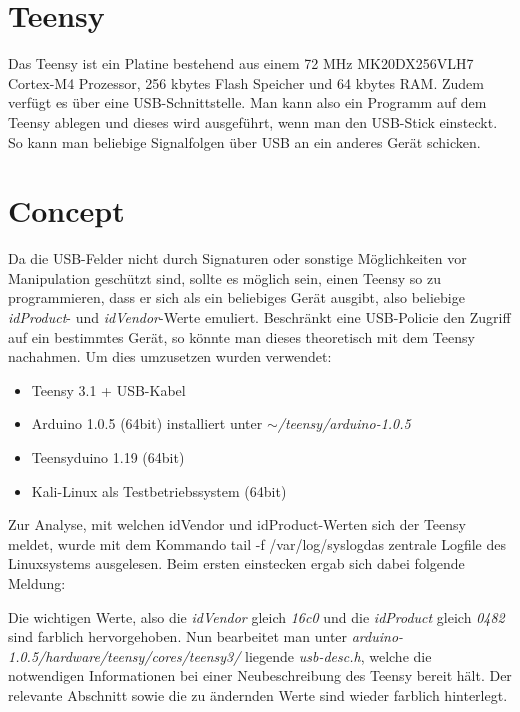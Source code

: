 \section{Teensy}
Das Teensy ist ein Platine bestehend aus einem 72 MHz MK20DX256VLH7 Cortex-M4 Prozessor, 256 kbytes Flash Speicher und 64 kbytes RAM. Zudem verfügt es über eine USB-Schnittstelle. Man kann also ein Programm auf dem Teensy ablegen und dieses wird ausgeführt, wenn man den USB-Stick einsteckt. So kann man beliebige Signalfolgen über USB an ein anderes Gerät schicken.
			
\section{Concept}
Da die USB-Felder nicht durch Signaturen oder sonstige Möglichkeiten vor Manipulation geschützt sind, sollte es möglich sein, einen Teensy so zu programmieren, dass er sich als ein beliebiges Gerät ausgibt, also beliebige \textit{idProduct}- und \textit{idVendor}-Werte emuliert. Beschränkt eine USB-Policie den Zugriff auf ein bestimmtes Gerät, so könnte man dieses theoretisch mit dem Teensy nachahmen.
Um dies umzusetzen wurden verwendet:

\begin{itemize}
	\item Teensy 3.1 + USB-Kabel
	\item Arduino 1.0.5 (64bit) installiert unter \textit{$\sim$/teensy/arduino-1.0.5}
	\item Teensyduino 1.19 (64bit)
	\item Kali-Linux als Testbetriebssystem (64bit)
\end{itemize}

Zur Analyse, mit welchen idVendor und idProduct-Werten sich der Teensy meldet, wurde mit dem Kommando \glqq tail -f /var/log/syslog\grqq das zentrale Logfile des Linuxsystems ausgelesen. Beim ersten einstecken ergab sich dabei folgende Meldung:

\lstset{language=log}


Die wichtigen Werte, also die \textit{idVendor} gleich \textit{16c0} und die \textit{idProduct} gleich \textit{0482} sind farblich hervorgehoben. Nun bearbeitet man unter \textit{arduino-1.0.5/hardware/teensy/cores/teensy3/} liegende \textit{usb-desc.h}, welche die notwendigen Informationen bei einer Neubeschreibung des Teensy bereit hält. Der relevante Abschnitt sowie die zu ändernden Werte sind wieder farblich hinterlegt.

